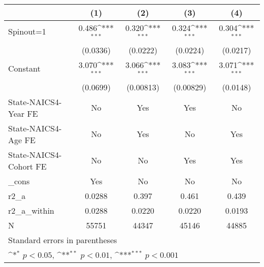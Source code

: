{
\def\sym#1{\ifmmode^{#1}\else\(^{#1}\)\fi}
\begin{tabular}{l*{4}{c}}
\hline\hline
                    &\multicolumn{1}{c}{(1)}         &\multicolumn{1}{c}{(2)}         &\multicolumn{1}{c}{(3)}         &\multicolumn{1}{c}{(4)}         \\
\hline
Spinout=1           &       0.486\sym{***}&       0.320\sym{***}&       0.324\sym{***}&       0.304\sym{***}\\
                    &    (0.0336)         &    (0.0222)         &    (0.0224)         &    (0.0217)         \\
[1em]
Constant            &       3.070\sym{***}&       3.066\sym{***}&       3.083\sym{***}&       3.071\sym{***}\\
                    &    (0.0699)         &   (0.00813)         &   (0.00829)         &    (0.0148)         \\
[1em]
State-NAICS4-Year FE&          No         &         Yes         &         Yes         &          No         \\
[1em]
State-NAICS4-Age FE &          No         &         Yes         &          No         &         Yes         \\
[1em]
State-NAICS4-Cohort FE&          No         &          No         &         Yes         &         Yes         \\
[1em]
\_cons              &         Yes         &          No         &          No         &          No         \\
\hline
r2\_a                &      0.0288         &       0.397         &       0.461         &       0.439         \\
r2\_a\_within         &      0.0288         &      0.0220         &      0.0220         &      0.0193         \\
N                   &       55751         &       44347         &       45146         &       44885         \\
\hline\hline
\multicolumn{5}{l}{\footnotesize Standard errors in parentheses}\\
\multicolumn{5}{l}{\footnotesize \sym{*} \(p<0.05\), \sym{**} \(p<0.01\), \sym{***} \(p<0.001\)}\\
\end{tabular}
}
